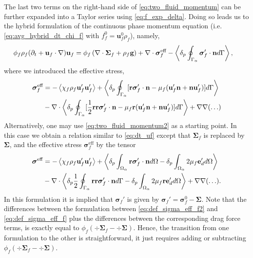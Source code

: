 The last two terms on the right-hand side of \ref{eq:two_fluid_momentum} can be further expanded into a Taylor series using \ref{eq:f_exp_delta}. 
Doing so leads us to the hybrid formulation of the continuous phase momentum  equation (i.e. \ref{eq:avg_hybrid_dt_chi_f} with $f_f^0 = \textbf{u}_f^0\rho_f$), namely,
\begin{align}
    \phi_f \rho_f(\pddt + \textbf{u}_f  \cdot \grad) \textbf{u}_f
    &= \phi_f 
    \left(\div \bm{\Sigma}_f
    + \rho_f \textbf{g}\right)
    + \div \bm\sigma_f^\text{eff}
    - \pSavg{\bm\sigma_f'\cdot \textbf{n}}, 
    \label{eq:dt_uf}
\end{align}
where we introduced the effective stress, 
\begin{align}
    \bm{\sigma}^{\text{eff}}_f 
    &= 
    - \avg{\chi_f\rho_f \textbf{u}_f'\textbf{u}_f'} 
    + \pSavg{[\textbf{r}\bm\sigma'_f\cdot \textbf{n} - \mu_f (\textbf{u}_f' \textbf{n} + \textbf{n} \textbf{u}_f')]}\nonumber\\
    &- \div
        \pSavg{[\frac{1}{2}\textbf{rr}\bm\sigma'_f\cdot \textbf{n}- \mu_f\textbf{r} (\textbf{u}_f' \textbf{n} + \textbf{n} \textbf{u}_f')]}
        + \grad\grad (\ldots)
    \label{eq:def_sigma_eff_f}
\end{align}
Alternatively, one may use \ref{eq:two_fluid_momentum2} as a starting point.
In this case we obtain a relation similar to \ref{eq:dt_uf} except that $\bm\Sigma_f$ is replaced by $\bm\Sigma$, and the effective stress $\bm\sigma_f^\text{eff}$ by the tensor
\begin{align}
    \bm{\sigma}^{\text{eff}} 
    &= 
    - \avg{\chi_f\rho_f \textbf{u}_f'\textbf{u}_f'} 
    + \pavg{\intO{\textbf{r}\bm\sigma'_f\cdot \textbf{n}} - \delta_p\intO{2\mu_f\textbf{e}_d'}}\nonumber\\
    &- \div
        \pavg{ \frac{1}{2}\intS{\textbf{rr}\bm\sigma'_f\cdot \textbf{n}}
        - \delta_p\intO{2\mu_f \textbf{r} \textbf{e}_d'}}
        + \grad\grad (\ldots). 
    \label{eq:def_sigma_eff_f2}
\end{align}
In this formulation it is implied that $\bm\sigma_f'$ is given by $\bm\sigma_f' = \bm\sigma_f^0 -\bm\Sigma$. 
Note that the differences between the formulation between \ref{eq:def_sigma_eff_f2} and \ref{eq:def_sigma_eff_f} plus the differences between the corresponding drag force terms, is exactly equal to $\phi_f (\div \bm\Sigma_f - \div\bm\Sigma)$.
Hence, the transition from one formulation to the other is straightforward, it just requires adding or subtracting $\phi_f (\div \bm\Sigma_f - \div\bm\Sigma)$. 


